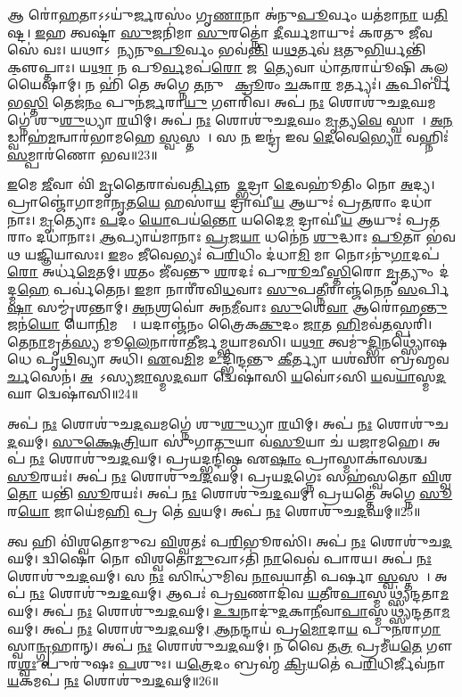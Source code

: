 𑌆 𑌰𑍋॑\ul{𑌹}𑌤𑌾𑌽𑌽𑌯𑍁॑\ul{𑌰𑍍𑌜}𑌰𑌸𑌂॑ 𑌗𑍃\ul{𑌣𑌾}𑌨𑌾 𑌅॑𑌨𑍁\ul{𑌪𑍂}𑌰𑍍𑌵𑌂 𑌯𑌤॑𑌮𑌾\ul{𑌨𑌾} 𑌯\ul{𑌤𑌿}𑌷𑍍𑌟। 
\ul{𑌇}𑌹 𑌤𑍍𑌵𑌷𑍍𑌟𑌾॑ \ul{𑌸𑍁}𑌜𑌨𑌿॑𑌮𑌾 \ul{𑌸𑍁}𑌰𑌤𑍍𑌨𑍋॑ \ul{𑌦𑍀}𑌰𑍍𑌘𑌮𑌾𑌯𑍁𑌃॑ 𑌕𑌰𑌤𑍁 \ul{𑌜𑍀}𑌵𑌸𑍇॑ 𑌵𑌃। 
𑌯𑌥𑌾𑌽𑌹𑌾᳚𑌨𑍍𑌯𑌨𑍁\ul{𑌪𑍂}𑌰𑍍𑌵𑌂 𑌭𑌵॑\ul{𑌨𑍍𑌤𑌿} 𑌯\ul{𑌥}𑌰𑍍𑌤𑌵॑ \ul{𑌋}𑌤𑍁\ul{𑌭𑌿}𑌰𑍍𑌯𑌨𑍍𑌤𑌿॑ 𑌕𑍢॒𑌪𑍍𑌤𑌾𑌃। 
𑌯\ul{𑌥𑌾} 𑌨 𑌪𑍂\ul{𑌰𑍍𑌵}𑌮𑌪॑\ul{𑌰𑍋} 𑌜𑌹𑌾᳚\ul{𑌤𑍍𑌯𑍇}𑌵𑌾 𑌧𑌾॑\ul{𑌤}𑌰𑌾𑌯𑍂॑𑌷𑌿 𑌕𑌲𑍍𑌪𑌯𑍈𑌷𑌾𑌮𑍍। 
𑌨 𑌹𑌿॑ 𑌤𑍇 𑌅𑌗𑍍𑌨𑍇 \ul{𑌤}𑌨𑍁𑌵𑍈᳚ \ul{𑌕𑍍𑌰𑍂}𑌰𑌂 \ul{𑌚}𑌕𑌾\ul{𑌰} 𑌮𑌰𑍍𑌤𑍍𑌯𑌃॑। 
\ul{𑌕}𑌪𑌿𑌰𑍍𑌬॑𑌭\ul{𑌸𑍍𑌤𑌿} 𑌤𑍇𑌜॑\ul{𑌨𑌂} 𑌪𑍁𑌨॑\ul{𑌰𑍍𑌜}𑌰𑌾\ul{𑌯𑍁} 𑌗𑍗𑌰𑌿॑𑌵। 
𑌅𑌪॑ \ul{𑌨𑌃} 𑌶𑍋𑌶𑍁॑𑌚\ul{𑌦}𑌘𑌮𑌗𑍍𑌨𑍇॑ 𑌶𑍁\ul{𑌶𑍁}𑌧𑍍𑌯𑌾 \ul{𑌰}𑌯𑌿𑌮𑍍। 
𑌅𑌪॑ \ul{𑌨𑌃} 𑌶𑍋𑌶𑍁॑𑌚\ul{𑌦}𑌘𑌂 \ul{𑌮𑍃}𑌤𑍍𑌯\ul{𑌵𑍇} 𑌸𑍍𑌵𑌾𑌹𑌾᳚। 
\ul{𑌅}\ul{𑌨}𑌡𑍍𑌵𑌾𑌹॑\ul{𑌮}𑌨𑍍𑌵𑌾𑌰॑𑌭𑌾𑌮𑌹𑍇 \ul{𑌸𑍍𑌵}𑌸𑍍𑌤𑌯𑍇᳚। 
𑌸 \ul{𑌨} 𑌇𑌨𑍍𑌦𑍍𑌰॑ 𑌇𑌵 \ul{𑌦𑍇}𑌵𑍇\ul{𑌭𑍍𑌯𑍋} 𑌵𑌹𑍍𑌨𑌿𑌃॑ \ul{𑌸}𑌮𑍍𑌪𑌾𑌰॑𑌣𑍋 𑌭𑌵॥23॥

\ul{𑌇}𑌮𑍇 \ul{𑌜𑍀}𑌵𑌾 𑌵𑌿॑ \ul{𑌮𑍃}𑌤𑍈𑌰𑌾𑌵॑𑌵\ul{𑌰𑍍𑌤𑌿}𑌨𑍍𑌨𑌭𑍂᳚\ul{𑌦𑍍𑌭}𑌦𑍍𑌰𑌾 \ul{𑌦𑍇}𑌵𑌹𑍂॑𑌤𑌿𑌂 𑌨𑍋 \ul{𑌅}𑌦𑍍𑌯। 
𑌪𑍍𑌰𑌾𑌞𑍍𑌜𑍋॑𑌗𑌾𑌮𑌾\ul{𑌨𑍃}𑌤\ul{𑌯𑍇} 𑌹𑌸𑌾॑\ul{𑌯} 𑌦𑍍𑌰𑌾𑌘𑍀॑\ul{𑌯} 𑌆𑌯𑍁𑌃॑ 𑌪𑍍𑌰\ul{𑌤}𑌰𑌾𑌂 𑌦𑌧𑌾॑𑌨𑌾𑌃। 
\ul{𑌮𑍃}𑌤𑍍𑌯𑍋𑌃 \ul{𑌪}𑌦𑌂 \ul{𑌯𑍋}𑌪𑌯॑\ul{𑌨𑍍𑌤𑍋} 𑌯𑌦𑍈\ul{𑌮} 𑌦𑍍𑌰𑌾𑌘𑍀॑\ul{𑌯} 𑌆𑌯𑍁𑌃॑ 𑌪𑍍𑌰\ul{𑌤}𑌰𑌾𑌂 𑌦𑌧𑌾॑𑌨𑌾𑌃। 
\ul{𑌆}𑌪𑍍𑌯𑌾𑌯॑𑌮𑌾𑌨𑌾𑌃 \ul{𑌪𑍍𑌰}𑌜\ul{𑌯𑌾} 𑌧𑌨𑍇॑𑌨 \ul{𑌶𑍁}𑌦𑍍𑌧𑌾𑌃 \ul{𑌪𑍂}𑌤𑌾 𑌭॑𑌵𑌥 𑌯𑌜𑍍𑌞𑌿𑌯𑌾𑌸𑌃। 
\ul{𑌇}𑌮𑌂 \ul{𑌜𑍀}𑌵𑍇𑌭𑍍𑌯𑌃॑ 𑌪\ul{𑌰𑌿}𑌧𑌿𑌂 𑌦॑𑌧𑌾\ul{𑌮𑌿} 𑌮𑌾 𑌨𑍋𑌽𑌨𑍁॑\ul{𑌗𑌾}𑌦𑌪॑\ul{𑌰𑍋} 𑌅𑌰𑍍𑌧॑\ul{𑌮𑍇}𑌤𑌮𑍍। 
\ul{𑌶}𑌤𑌂 𑌜𑍀॑𑌵𑌨𑍍𑌤𑍁 \ul{𑌶}𑌰𑌦𑌃॑ 𑌪𑍁\ul{𑌰𑍂}𑌚𑍀\ul{𑌸𑍍𑌤𑌿}𑌰𑍋 \ul{𑌮𑍃}𑌤𑍍𑌯𑍁𑌂 𑌦॑𑌦𑍍𑌮\ul{𑌹𑍇} 𑌪𑌰𑍍𑌵॑𑌤𑍇𑌨। 
\ul{𑌇}𑌮𑌾 𑌨𑌾𑌰𑍀॑𑌰𑌵𑌿\ul{𑌧}𑌵𑌾𑌃 \ul{𑌸𑍁}𑌪\ul{𑌤𑍍𑌨𑍀}𑌰𑌾𑌞𑍍𑌜॑𑌨𑍇𑌨 \ul{𑌸}𑌰𑍍𑌪𑌿\ul{𑌷𑌾} 𑌸𑌮𑍍𑌮𑍃॑𑌶𑌨𑍍𑌤𑌾𑌮𑍍। 
\ul{𑌅}\ul{𑌨}𑌶𑍍𑌰𑌵𑍋॑ 𑌅𑌨\ul{𑌮𑍀}𑌵𑌾𑌃 \ul{𑌸𑍁}𑌶𑍇\ul{𑌵𑌾} 𑌆𑌰𑍋॑𑌹\ul{𑌨𑍍𑌤𑍁} 𑌜𑌨॑\ul{𑌯𑍋} 𑌯𑍋\ul{𑌨𑌿}𑌮𑌗𑍍𑌰𑍇᳚। 
𑌯𑌦𑌾𑌞𑍍𑌜॑𑌨𑌂 𑌤𑍍𑌰𑍈𑌕\ul{𑌕𑍁}𑌦𑌂 \ul{𑌜𑌾}𑌤 \ul{𑌹𑌿}𑌮𑌵॑\ul{𑌤}𑌸𑍍𑌪𑌰𑌿॑। 
𑌤𑍇\ul{𑌨𑌾}𑌮𑍃𑌤॑\ul{𑌸𑍍𑌯} 𑌮𑍂\ul{𑌲𑍇}𑌨𑌾𑌰𑌾॑𑌤𑍀𑌰𑍍𑌜𑌮𑍍𑌭𑌯𑌾𑌮𑌸𑌿। 
𑌯\ul{𑌥𑌾} 𑌤𑍍𑌵𑌮𑍁॑\ul{𑌦𑍍𑌭𑌿}𑌨𑌥𑍍𑌸𑍍𑌯𑍋॑𑌷𑌧𑍇 𑌪𑍃\ul{𑌥𑌿}𑌵𑍍𑌯𑌾 𑌅𑌧𑌿॑। 
\ul{𑌏}𑌵\ul{𑌮𑌿}𑌮 𑌉𑌦𑍍𑌭𑌿॑𑌨𑍍𑌦𑌨𑍍𑌤𑍁 \ul{𑌕𑍀}𑌰𑍍𑌤𑍍𑌯𑌾 𑌯𑌶॑𑌸𑌾 𑌬𑍍𑌰𑌹𑍍𑌮𑌵\ul{𑌰𑍍𑌚}𑌸𑍇𑌨॑। 
\ul{𑌅}𑌜𑍋᳚𑌽𑌸𑍍𑌯\ul{𑌜𑌾}𑌸𑍍𑌮\ul{𑌦}𑌘𑌾 𑌦𑍍𑌵𑍇𑌷𑌾॑𑌸𑌿 \ul{𑌯}𑌵𑍋॑𑌽𑌸𑌿 \ul{𑌯}𑌵\ul{𑌯𑌾}𑌸𑍍𑌮\ul{𑌦}𑌘𑌾 𑌦𑍍𑌵𑍇𑌷𑌾॑𑌸𑌿॥24॥
\anuvakamend[\ul{𑌭}\ul{𑌵} \ul{𑌜}\ul{𑌮𑍍𑌭}\ul{𑌯𑌾}\ul{𑌮}\ul{𑌸𑌿} 𑌤𑍍𑌰𑍀𑌣𑌿॑ 𑌚]

𑌅𑌪॑ \ul{𑌨𑌃} 𑌶𑍋𑌶𑍁॑𑌚\ul{𑌦}𑌘𑌮𑌗𑍍𑌨𑍇॑ 𑌶𑍁\ul{𑌶𑍁}𑌧𑍍𑌯𑌾 \ul{𑌰}𑌯𑌿𑌮𑍍। 
𑌅𑌪॑ \ul{𑌨𑌃} 𑌶𑍋𑌶𑍁॑𑌚\ul{𑌦}𑌘𑌮𑍍। 
\ul{𑌸𑍁}\ul{𑌕𑍍𑌷𑍇}\ul{𑌤𑍍𑌰𑌿}𑌯𑌾 𑌸𑍁॑𑌗𑌾\ul{𑌤𑍁}𑌯𑌾 𑌵॑\ul{𑌸𑍂}𑌯𑌾 𑌚॑ 𑌯𑌜𑌾𑌮𑌹𑍇। 
𑌅𑌪॑ \ul{𑌨𑌃} 𑌶𑍋𑌶𑍁॑𑌚\ul{𑌦}𑌘𑌮𑍍। 
𑌪𑍍𑌰𑌯𑌦𑍍𑌭𑌨𑍍𑌦𑌿॑𑌷𑍍𑌠 𑌏\ul{𑌷𑌾𑌂} 𑌪𑍍𑌰𑌾𑌸𑍍𑌮𑌾𑌕𑌾॑𑌸𑌶𑍍𑌚 \ul{𑌸𑍂}𑌰𑌯𑌃॑। 
𑌅𑌪॑ \ul{𑌨𑌃} 𑌶𑍋𑌶𑍁॑𑌚\ul{𑌦}𑌘𑌮𑍍। 
𑌪𑍍𑌰𑌯\ul{𑌦}𑌗𑍍𑌨𑍇𑌃 𑌸𑌹॑𑌸𑍍𑌵𑌤𑍋 \ul{𑌵𑌿}𑌶𑍍𑌵\ul{𑌤𑍋} 𑌯𑌨𑍍𑌤𑌿॑ \ul{𑌸𑍂}𑌰𑌯𑌃॑। 
𑌅𑌪॑ \ul{𑌨𑌃} 𑌶𑍋𑌶𑍁॑𑌚\ul{𑌦}𑌘𑌮𑍍। 
𑌪𑍍𑌰𑌯𑌤𑍍𑌤𑍇॑ 𑌅𑌗𑍍𑌨𑍇 \ul{𑌸𑍂}𑌰\ul{𑌯𑍋} 𑌜𑌾𑌯𑍇॑𑌮\ul{𑌹𑌿} 𑌪𑍍𑌰 𑌤𑍇॑ \ul{𑌵}𑌯𑌮𑍍। 
𑌅𑌪॑ \ul{𑌨𑌃} 𑌶𑍋𑌶𑍁॑𑌚\ul{𑌦}𑌘𑌮𑍍॥25॥

𑌤𑍍𑌵 𑌹𑌿 𑌵𑌿॑𑌶𑍍𑌵𑌤𑍋𑌮𑍁𑌖 \ul{𑌵𑌿}𑌶𑍍𑌵𑌤𑌃॑ 𑌪\ul{𑌰𑌿}𑌭𑍂𑌰𑌸𑌿॑। 
𑌅𑌪॑ \ul{𑌨𑌃} 𑌶𑍋𑌶𑍁॑𑌚\ul{𑌦}𑌘𑌮𑍍। 
𑌦𑍍𑌵𑌿𑌷𑍋॑ 𑌨𑍋 𑌵𑌿𑌶𑍍𑌵𑌤𑍋\ul{𑌮𑍁}𑌖𑌾𑌽𑌤𑌿॑ \ul{𑌨𑌾}𑌵𑍇𑌵॑ 𑌪𑌾𑌰𑌯। 
𑌅𑌪॑ \ul{𑌨𑌃} 𑌶𑍋𑌶𑍁॑𑌚\ul{𑌦}𑌘𑌮𑍍। 
𑌸 \ul{𑌨𑌃} 𑌸𑌿𑌨𑍍𑌧𑍁॑𑌮𑌿𑌵 \ul{𑌨𑌾}𑌵𑌯𑌾𑌤𑌿॑ 𑌪𑌰𑍍\mbox{}𑌷𑌾 \ul{𑌸𑍍𑌵}𑌸𑍍𑌤𑌯𑍇᳚। 
𑌅𑌪॑ \ul{𑌨𑌃} 𑌶𑍋𑌶𑍁॑𑌚\ul{𑌦}𑌘𑌮𑍍। 
𑌆𑌪𑌃॑ 𑌪𑍍𑌰\ul{𑌵}𑌣𑌾𑌦𑌿॑𑌵 \ul{𑌯}𑌤𑍀𑌰\ul{𑌪𑌾}𑌸𑍍𑌮𑌥𑍍𑌸𑍍𑌯॑𑌨𑍍𑌦𑌤𑌾\ul{𑌮}𑌘𑌮𑍍। 
𑌅𑌪॑ \ul{𑌨𑌃} 𑌶𑍋𑌶𑍁॑𑌚\ul{𑌦}𑌘𑌮𑍍। 
\ul{𑌉}\ul{𑌦𑍍𑌵}𑌨𑌾𑌦𑍁॑\ul{𑌦}𑌕𑌾\ul{𑌨𑍀}𑌵𑌾\ul{𑌪𑌾}𑌸𑍍𑌮𑌥𑍍𑌸𑍍𑌯॑𑌨𑍍𑌦𑌤𑌾\ul{𑌮}𑌘𑌮𑍍। 
𑌅𑌪॑ \ul{𑌨𑌃} 𑌶𑍋𑌶𑍁॑𑌚\ul{𑌦}𑌘𑌮𑍍। 
\ul{𑌆}\ul{𑌨}𑌨𑍍𑌦𑌾𑌯॑ 𑌪𑍍𑌰\ul{𑌮𑍋}𑌦𑌾\ul{𑌯} 𑌪𑍁\ul{𑌨}𑌰𑌾\ul{𑌗𑌾}\ul{} 𑌸𑍍𑌵𑌾\ul{𑌨𑍍𑌗𑍃}𑌹𑌾𑌨𑍍। 
𑌅𑌪॑ \ul{𑌨𑌃} 𑌶𑍋𑌶𑍁॑𑌚\ul{𑌦}𑌘𑌮𑍍। 
𑌨 𑌵𑍈 𑌤\ul{𑌤𑍍𑌰} 𑌪𑍍𑌰𑌮𑍀॑𑌯\ul{𑌤𑍇} 𑌗𑍗𑌰\ul{𑌶𑍍𑌵𑌃} 𑌪𑍁𑌰𑍁॑𑌷𑌃 \ul{𑌪}𑌶𑍁𑌃। 
𑌯\ul{𑌤𑍍𑌰𑍇}𑌦𑌂 𑌬𑍍𑌰𑌹𑍍𑌮॑ \ul{𑌕𑍍𑌰𑌿}𑌯𑌤𑍇॑ 𑌪\ul{𑌰𑌿}𑌧𑌿𑌰𑍍𑌜𑍀𑌵॑𑌨𑌾\ul{𑌯}𑌕𑌮𑌪॑ \ul{𑌨𑌃} 𑌶𑍋𑌶𑍁॑𑌚\ul{𑌦}𑌘𑌮𑍍॥26॥
\anuvakamend[\ul{𑌅}𑌘\ul{𑌮}𑌘𑌂 \ul{𑌚}𑌤𑍍𑌵𑌾𑌰𑌿॑ 𑌚]

